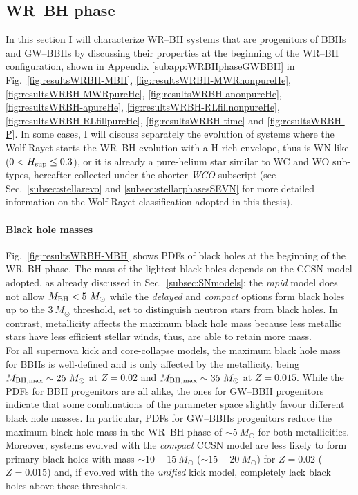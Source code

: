 \documentclass[a4paper,titlepage]{book}     	%
\newcommand{\sun}{\ensuremath{_\odot}}
\newcommand{\msun}{\ensuremath{M\sun}}
\newcommand{\mbh}{\ensuremath{M_\textup{BH}}}
\begin{document}
\subsection{WR--BH phase}\label{subsec:WRBHphaseBBHsGWBBHs}
In this section I will characterize WR--BH systems that are progenitors of BBHs and GW--BBHs by discussing their properties at the beginning of the WR--BH configuration, shown in Appendix \ref{subapp:WRBHphaseGWBBH} in Fig.\ \ref{fig:resultsWRBH-MBH}, \ref{fig:resultsWRBH-MWRnonpureHe}, \ref{fig:resultsWRBH-MWRpureHe}, \ref{fig:resultsWRBH-anonpureHe}, \ref{fig:resultsWRBH-apureHe}, \ref{fig:resultsWRBH-RLfillnonpureHe}, \ref{fig:resultsWRBH-RLfillpureHe}, \ref{fig:resultsWRBH-time} and \ref{fig:resultsWRBH-P}. In some cases, I will discuss separately the evolution of systems where the Wolf-Rayet starts the WR--BH evolution with a H-rich envelope, thus is WN-like ($0 < H_{\rm sup} \leq 0.3$), or it is already a pure-helium star similar to WC and WO sub-types, hereafter collected under the shorter \emph{WCO} subscript (see Sec.\ \ref{subsec:stellarevo} and \ref{subsec:stellarphasesSEVN} for more detailed information on the Wolf-Rayet classification adopted in this thesis).

\paragraph{Black hole masses} Fig.\ \ref{fig:resultsWRBH-MBH} shows PDFs of black holes at the beginning of the WR--BH phase. The mass of the lightest black holes depends on the CCSN model adopted, as already discussed in Sec.\ \ref{subsec:SNmodels}: the \emph{rapid} model does not allow $\mbh < 5~\msun$ while the \emph{delayed} and \emph{compact} options form black holes up to the $3~\msun$ threshold, set to distinguish neutron stars from black holes. In contrast, metallicity affects the maximum black hole mass because less metallic stars have less efficient stellar winds, thus, are able to retain more mass. \\

For all supernova kick and core-collapse models, the maximum black hole mass for BBHs is well-defined and is only affected by the metallicity, being $M_{\rm BH,max} \sim 25~\msun$ at $Z=0.02$ and $M_{\rm BH,max} \sim 35~\msun$ at $Z=0.015$. While the PDFs for BBH progenitors are all alike, the ones for GW--BBH progenitors indicate that some combinations of the parameter space slightly favour different black hole masses. In particular, PDFs for GW--BBHs progenitors reduce the maximum black hole mass in the WR--BH phase of $\sim 5~\msun$ for both metallicities. Moreover, systems evolved with the \emph{compact} CCSN model are less likely to form primary black holes with mass $\sim 10-15~\msun$ ($\sim 15-20~\msun$) for $Z=0.02$ ($Z=0.015$) and, if evolved with the \emph{unified} kick model, completely lack black holes above these thresholds.\\
\end{document}
